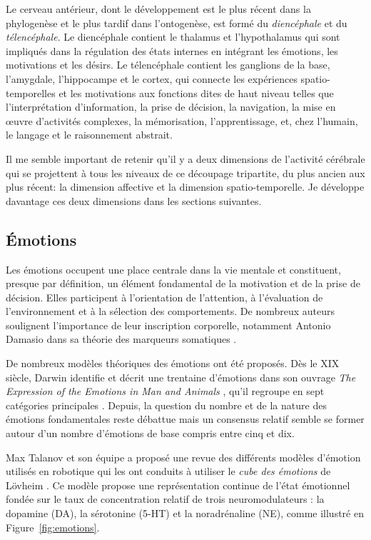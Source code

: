 Le cerveau antérieur, dont le développement est le plus récent dans la phylogenèse et le plus tardif dans l'ontogenèse, est formé du \emph{diencéphale} et du \emph{télencéphale}. 
Le diencéphale contient le thalamus et l'hypothalamus qui sont impliqués dans la régulation des états internes en intégrant les émotions, les motivations et les désirs.
Le télencéphale contient les ganglions de la base, l'amygdale, l’hippocampe et le cortex, qui connecte les expériences spatio-temporelles et les motivations aux fonctions dites de haut niveau telles que l'interprétation d'information, la prise de décision, la navigation, la mise en \oe uvre d'activités complexes, la mémorisation, l'apprentissage, et, chez l'humain, le langage et le raisonnement abstrait.

Il me semble important de retenir qu'il y a deux dimensions de l'activité cérébrale qui se projettent à tous les niveaux de ce découpage tripartite, du plus ancien aux plus récent: la dimension affective et la dimension spatio-temporelle.
Je développe davantage ces deux dimensions dans les sections suivantes.


\subsection{Émotions}

\noindent
Les émotions occupent une place centrale dans la vie mentale et constituent, presque par définition, un élément fondamental de la motivation et de la prise de décision. 
Elles participent à l’orientation de l’attention, à l’évaluation de l’environnement et à la sélection des comportements.
De nombreux auteurs soulignent l'importance de leur inscription corporelle, notamment Antonio Damasio dans sa théorie des marqueurs somatiques \cite{damasio_descartes_1994}. 

De nombreux modèles théoriques des émotions ont été proposés. 
Dès le XIX\ieme{} siècle, Darwin identifie et décrit une trentaine d’émotions dans son ouvrage \og \emph{The Expression of the Emotions in Man and Animals} \fg{}, qu’il regroupe en sept catégories principales \cite{darwin_expression_1872}. 
Depuis, la question du nombre et de la nature des émotions fondamentales reste débattue mais un consensus relatif semble se former autour d'un nombre d'émotions de base compris entre cinq et dix.

Max Talanov et son équipe a proposé une revue des différents modèles d'émotion utilisés en robotique qui les ont conduits à utiliser le \emph{cube des émotions} de Lövheim \cite{lovheim_new_2012}. 
Ce modèle propose une représentation continue de l’état émotionnel fondée sur le taux de concentration relatif de trois neuromodulateurs : la dopamine (DA), la sérotonine (5-HT) et la noradrénaline (NE), comme illustré en Figure~\ref{fig:emotions}.

